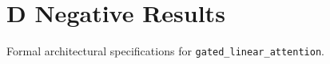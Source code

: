 \section{D Negative Results}

Formal architectural specifications for \texttt{gated_linear_attention}.

